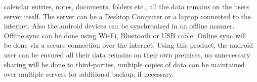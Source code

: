 calendar entries, notes, documents, folders etc., all the data remains on the users server itself.
The server can be a Desktop Computer or a laptop connected to the internet. Also the android
devices can be synchronized in an offline manner.\\[0.5cm]
\hspace*{0.82cm}Offline sync can be done using Wi-Fi, Bluetooth or USB cable. Online sync will be
done via a secure connection over the internet. Using this product, the android user can be
ensured all their data remains on their own premises, no unnecessary sharing will be done to
third-parties, multiple copies of data can be maintained over multiple servers for additional
backup, if necessary.\\[0.3cm]
